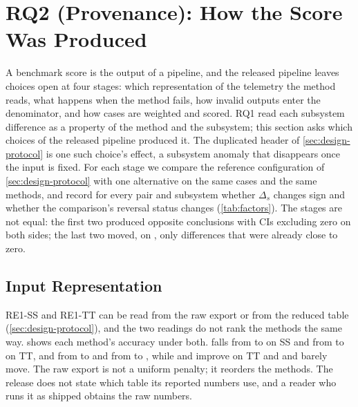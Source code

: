 \section{RQ2 (Provenance): How the Score Was Produced}
\label{sec:rq2}

A benchmark score is the output of a pipeline, and the released pipeline leaves choices open at four stages: which representation of the telemetry the method reads, what happens when the method fails, how invalid outputs enter the denominator, and how cases are weighted and scored.
RQ1 read each subsystem difference as a property of the method and the subsystem; this section asks which choices of the released pipeline produced it.
The duplicated header of \cref{sec:design-protocol} is one such choice's effect, a subsystem anomaly that disappears once the input is fixed.
For each stage we compare the reference configuration of \cref{sec:design-protocol} with one alternative on the same cases and the same methods, and record for every pair and subsystem whether $\Delta_s$ changes sign and whether the comparison's reversal status changes (\cref{tab:factors}).
The stages are not equal: the first two produced opposite conclusions with CIs excluding zero on both sides; the last two moved, on \openrca, only differences that were already close to zero.

\begin{table}[t]
\caption{Pipeline stages that change comparison conclusions. Comp.: comparisons (one method pair on one subsystem); Sign: comparisons whose $\Delta_s$ changes sign; Rev.: comparisons that are a reversal under exactly one of the two conditions. All pairs include probes and shipped baselines; --: no published pair has outputs under both conditions. Seed: the three-seed mean of a randomized method against any single seed, over the comparisons that involve such a method (\cref{sec:rq2-denominator}).}
\label{tab:factors}
\footnotesize

\end{table}

\subsection{Input Representation}
\label{sec:rq2-input}

RE1-SS and RE1-TT can be read from the raw export or from the reduced table (\cref{sec:design-protocol}), and the two readings do not rank the methods the same way.
 shows each method's accuracy under both.
\baro falls from \InSSBaroSimple to \InSSBaroRaw on SS and from \InTTBaroSimple to \InTTBaroRaw on TT, and \circa from \InSSCircaSimple to \InSSCircaRaw and from \InTTCircaSimple to \InTTCircaRaw, while \alertcount and \cdmin improve on TT and \ediag and \rcd barely move.
The raw export is not a uniform penalty; it reorders the methods.
The release does not state which table its reported numbers use, and a reader who runs it as shipped obtains the raw numbers.


